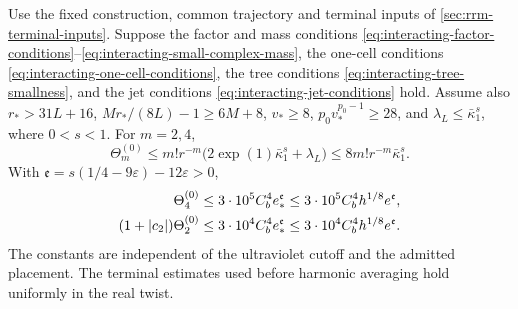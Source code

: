 \documentclass[11pt,letterpaper,reqno]{amsart}
\begin{document}
\begin{theorem}\label{thm:interacting-reference-error}
Use the fixed construction, common trajectory and terminal inputs of
\cref{sec:rrm-terminal-inputs}. Suppose the factor and mass conditions
\eqref{eq:interacting-factor-conditions}--\eqref{eq:interacting-small-complex-mass},
the one-cell conditions \eqref{eq:interacting-one-cell-conditions},
the tree conditions \eqref{eq:interacting-tree-smallness}, and the jet
conditions \eqref{eq:interacting-jet-conditions} hold. Assume also
$r_*>31L+16$, $Mr_*/(8L)-1\ge6M+8$,
$v_*\ge8$, $p_0v_*^{p_0-1}\ge28$, and
$\lambda_L\le\bar\kappa_1^s$, where $0<s<1$.
For $m=2,4$,
\begin{equation}\label{eq:interacting-Theta-bound}
 \Theta_m^{(0)}\le
        m!r^{-m}\bigl(2\exp(1)\bar\kappa_1^s+\lambda_L\bigr)
                       \le8m!r^{-m}\bar\kappa_1^s.
\end{equation}
With
$\mathfrak e=s(1/4-9\varepsilon)-12\varepsilon>0$,
\begin{align}
 \Theta_4^{(0)}
    &\le3\cdot10^5 C_b^4e_*^{\mathfrak e}
           \le3\cdot10^5C_b^4h^{1/8}e^{\mathfrak e},\notag\\
 (1+|c_2|)\Theta_2^{(0)}
    &\le3\cdot10^4C_b^4e_*^{\mathfrak e}
           \le3\cdot10^4C_b^4h^{1/8}e^{\mathfrak e}.
                                    \label{eq:interacting-final-terminal-error}
\end{align}
The constants are independent of the ultraviolet cutoff and the
admitted placement. The terminal estimates used before harmonic
averaging hold uniformly in the real twist.
\end{theorem}
\end{document}
